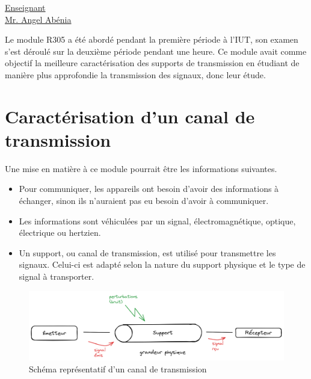 \renewcommand{\figurename}{}

\vspace*{0.2cm}%
      \large
      \href{\@orientadorPagina}{\color{black}Enseignant\\Mr. Angel Abénia}\\%
      \normalsize
\vspace*{0.5cm}%

Le module R305 a été abordé pendant la première période à l'IUT, son examen s'est déroulé sur la deuxième période pendant une heure. Ce module avait comme objectif la meilleure caractérisation des supports de transmission en étudiant de manière plus approfondie la transmission des signaux, donc leur étude.

\section{Caractérisation d'un canal de transmission}

Une mise en matière à ce module pourrait être les informations suivantes.
\begin{itemize}
  \item Pour communiquer, les appareils ont besoin d'avoir des informations à échanger, sinon ils n'auraient pas eu besoin d'avoir à communiquer.
  \item Les informations sont véhiculées par un signal, électromagnétique, optique, électrique ou hertzien.
  \item Un support, ou canal de transmission, est utilisé pour transmettre les signaux. Celui-ci est adapté selon la nature du support physique et le type de signal à transporter.
\end{itemize}

\begin{figure}[h]
    \centering
    \includegraphics[width=1\linewidth]{imgs/support.png}
    \caption{Schéma représentatif d'un canal de transmission}
    \label{fig:canal}
\end{figure}

